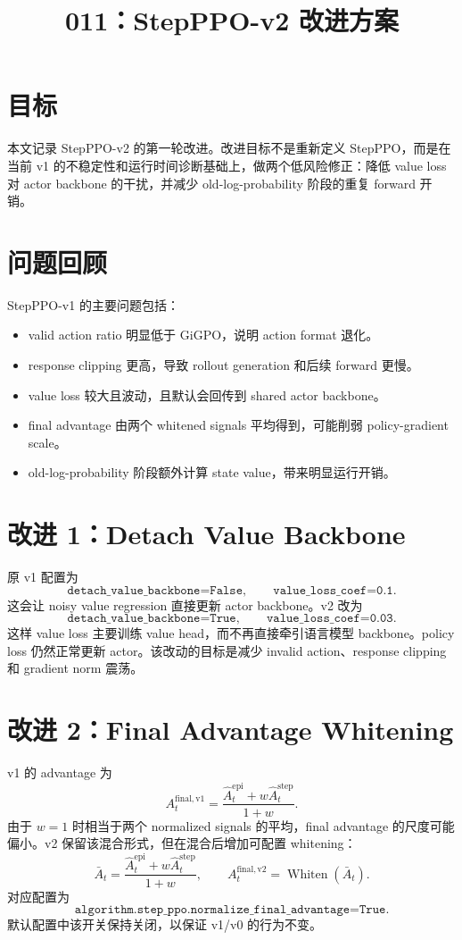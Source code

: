 \documentclass[10pt]{ctexart}
\title{011：StepPPO-v2 改进方案}
\author{}
\date{}
\newcommand{\Whiten}{\operatorname{Whiten}}
\begin{document}
\maketitle
\vspace{-1.2em}

\section*{目标}
本文记录 StepPPO-v2 的第一轮改进。改进目标不是重新定义 StepPPO，而是在当前 v1 的不稳定性和运行时间诊断基础上，做两个低风险修正：降低 value loss 对 actor backbone 的干扰，并减少 old-log-probability 阶段的重复 forward 开销。

\section*{问题回顾}
StepPPO-v1 的主要问题包括：
\begin{itemize}
\item valid action ratio 明显低于 GiGPO，说明 action format 退化。
\item response clipping 更高，导致 rollout generation 和后续 forward 更慢。
\item value loss 较大且波动，且默认会回传到 shared actor backbone。
\item final advantage 由两个 whitened signals 平均得到，可能削弱 policy-gradient scale。
\item old-log-probability 阶段额外计算 state value，带来明显运行开销。
\end{itemize}

\section*{改进 1：Detach Value Backbone}
原 v1 配置为
\[
\texttt{detach\_value\_backbone=False},
\qquad
\texttt{value\_loss\_coef=0.1}.
\]
这会让 noisy value regression 直接更新 actor backbone。v2 改为
\[
\texttt{detach\_value\_backbone=True},
\qquad
\texttt{value\_loss\_coef=0.03}.
\]
这样 value loss 主要训练 value head，而不再直接牵引语言模型 backbone。policy loss 仍然正常更新 actor。该改动的目标是减少 invalid action、response clipping 和 gradient norm 震荡。

\section*{改进 2：Final Advantage Whitening}
v1 的 advantage 为
\[
A_t^{\mathrm{final,v1}}
=\frac{\widehat A_t^{\mathrm{epi}}+w\widehat A_t^{\mathrm{step}}}{1+w}.
\]
由于 $w=1$ 时相当于两个 normalized signals 的平均，final advantage 的尺度可能偏小。v2 保留该混合形式，但在混合后增加可配置 whitening：
\[
\bar A_t
=\frac{\widehat A_t^{\mathrm{epi}}+w\widehat A_t^{\mathrm{step}}}{1+w},
\qquad
A_t^{\mathrm{final,v2}}=\Whiten(\bar A_t).
\]
对应配置为
\[
\texttt{algorithm.step\_ppo.normalize\_final\_advantage=True}.
\]
默认配置中该开关保持关闭，以保证 v1/v0 的行为不变。
\end{document}
